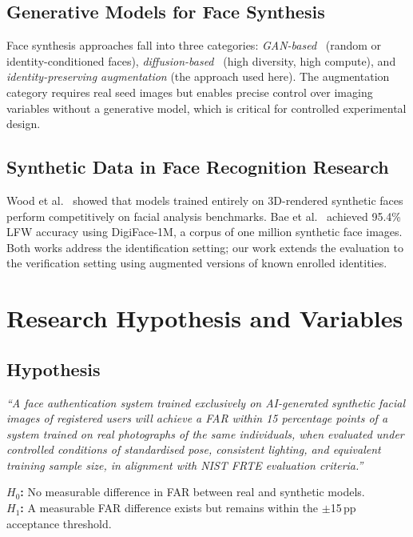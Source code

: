 \documentclass[conference]{IEEEtran}
\begin{document}
\subsection{Generative Models for Face Synthesis}

Face synthesis approaches fall into three categories: \textit{GAN-based}~\cite{goodfellow2014gan, karras2020stylegan2} (random or identity-conditioned faces), \textit{diffusion-based}~\cite{rombach2022diffusion} (high diversity, high compute), and \textit{identity-preserving augmentation} (the approach used here). The augmentation category requires real seed images but enables precise control over imaging variables without a generative model, which is critical for controlled experimental design.

\subsection{Synthetic Data in Face Recognition Research}

Wood et al.~\cite{wood2021fake} showed that models trained entirely on 3D-rendered synthetic faces perform competitively on facial analysis benchmarks. Bae et al.~\cite{bae2023digiface} achieved 95.4\% LFW accuracy using DigiFace-1M, a corpus of one million synthetic face images. Both works address the identification setting; our work extends the evaluation to the verification setting using augmented versions of known enrolled identities.

\section{Research Hypothesis and Variables}

\subsection{Hypothesis}

\textit{``A face authentication system trained exclusively on AI-generated synthetic facial images of registered users will achieve a FAR within 15 percentage points of a system trained on real photographs of the same individuals, when evaluated under controlled conditions of standardised pose, consistent lighting, and equivalent training sample size, in alignment with NIST FRTE evaluation criteria.''}

\noindent\textbf{$H_0$:} No measurable difference in FAR between real and synthetic models.\\
\textbf{$H_1$:} A measurable FAR difference exists but remains within the $\pm$15\,pp acceptance threshold.
\end{document}
